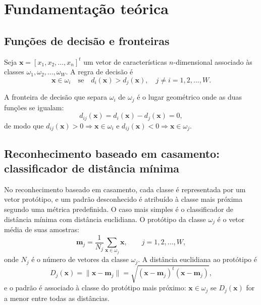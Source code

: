 \documentclass[12pt,a4paper]{article}
\begin{document}
\section{Fundamentação teórica}\label{sec:teoria}

\subsection{Funções de decisão e fronteiras}

Seja $\mathbf{x} = [x_1, x_2, \dots, x_n]^t$ um vetor de características $n$-dimensional associado às classes $\omega_1, \omega_2, \dots, \omega_W$. A regra de decisão é
\begin{equation}
  \mathbf{x} \in \omega_i \quad \text{se} \quad d_i(\mathbf{x}) > d_j(\mathbf{x}), \quad j \neq i = 1, 2, \dots, W.
  \label{eq:regra}
\end{equation}

A fronteira de decisão que separa $\omega_i$ de $\omega_j$ é o lugar geométrico onde as duas funções se igualam:
\begin{equation}
  d_{ij}(\mathbf{x}) = d_i(\mathbf{x}) - d_j(\mathbf{x}) = 0,
  \label{eq:fronteira}
\end{equation}
de modo que $d_{ij}(\mathbf{x}) > 0 \Rightarrow \mathbf{x} \in \omega_i$ e $d_{ij}(\mathbf{x}) < 0 \Rightarrow \mathbf{x} \in \omega_j$.

\subsection{Reconhecimento baseado em casamento: classificador de distância mínima}

No reconhecimento baseado em casamento, cada classe é representada por um vetor protótipo, e um padrão desconhecido é atribuído à classe mais próxima segundo uma métrica predefinida. O caso mais simples é o classificador de distância mínima com distância euclidiana. O protótipo da classe $\omega_j$ é o vetor média de suas amostras:
\begin{equation}
  \mathbf{m}_j = \frac{1}{N_j} \sum_{\mathbf{x} \in \omega_j} \mathbf{x}, \qquad j = 1, 2, \dots, W,
  \label{eq:prototipo}
\end{equation}
onde $N_j$ é o número de vetores da classe $\omega_j$. A distância euclidiana ao protótipo é
\begin{equation}
  D_j(\mathbf{x}) = \lVert \mathbf{x} - \mathbf{m}_j \rVert = \sqrt{(\mathbf{x} - \mathbf{m}_j)^t (\mathbf{x} - \mathbf{m}_j)},
  \label{eq:distancia}
\end{equation}
e o padrão é associado à classe do protótipo mais próximo: $\mathbf{x} \in \omega_j$ se $D_j(\mathbf{x})$ for a menor entre todas as distâncias.
\end{document}
